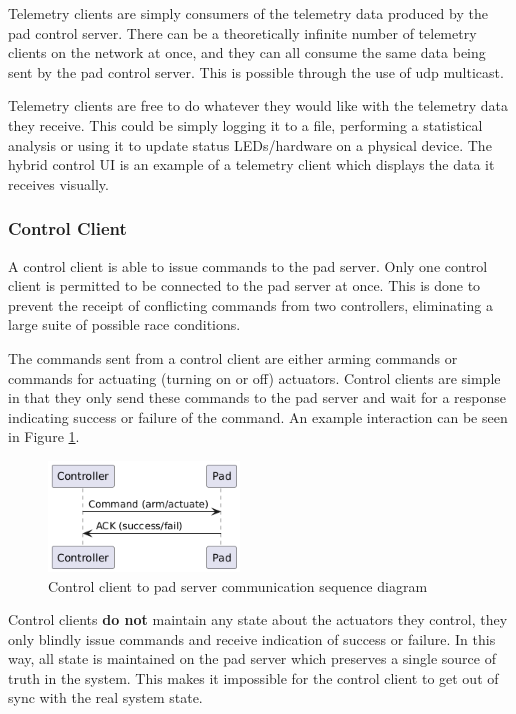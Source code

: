 Telemetry clients are simply consumers of the telemetry data produced by the pad control server. There can be a
theoretically infinite number of telemetry clients on the network at once, and they can all consume the same data being
sent by the pad control server. This is possible through the use of \gls{udp} multicast.

Telemetry clients are free to do whatever they would like with the telemetry data they receive. This could be simply
logging it to a file, performing a statistical analysis or using it to update status LEDs/hardware on a physical
device. The hybrid control UI is an example of a telemetry client which displays the data it receives visually.

\subsubsection{Control Client}

A control client is able to issue commands to the pad server. Only one control client is permitted to be connected to
the pad server at once. This is done to prevent the receipt of conflicting commands from two controllers, eliminating a
large suite of possible race conditions.

The commands sent from a control client are either arming commands or commands for actuating (turning on or off)
actuators. Control clients are simple in that they only send these commands to the pad server and wait for a response
indicating success or failure of the command. An example interaction can be seen in Figure \ref{fig:cntrl-pad-seq}.

\begin{figure}[H]
    \center
    \includegraphics[width=2in]{assets/diagrams/control_client_and_pad_sequence.png}
    \caption{Control client to pad server communication sequence diagram}
    \label{fig:cntrl-pad-seq}
\end{figure}

Control clients \textbf{do not} maintain any state about the actuators they control, they only blindly issue commands
and receive indication of success or failure. In this way, all state is maintained on the pad server which preserves a
single source of truth in the system. This makes it impossible for the control client to get out of sync with the real
system state.

